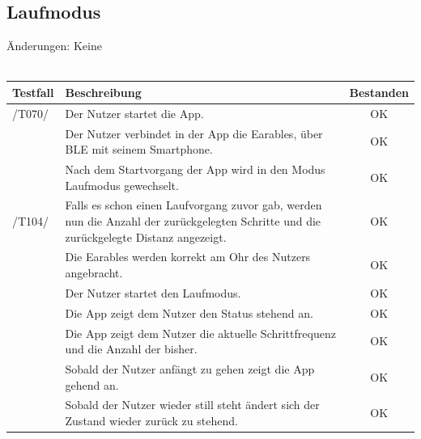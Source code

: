 \documentclass[a4paper,12pt]{article}
\newcommand{\testok}[0]{
	\cellcolor{green!25} OK
}
\begin{document}
\subsection{Laufmodus}
Änderungen: Keine
\\
\\
\begin{tabular}{ |p{1.5cm} | p{12cm} | c| }
	\hline
	\textbf{Testfall} & \textbf{Beschreibung} & \textbf{Bestanden}\\
	\hline
	/T070/ & Der Nutzer startet die App. & \testok \\
	\hline
	& Der Nutzer verbindet in der App die Earables, über BLE mit seinem Smartphone. & \testok \\
	\hline
	& Nach dem Startvorgang der App wird in den Modus \glqq Laufmodus\grqq{} gewechselt. & \testok \\
	\hline
	/T104/ & Falls es schon einen Laufvorgang zuvor gab, werden nun die Anzahl der zurückgelegten Schritte und die zurückgelegte Distanz angezeigt.& \testok \\
	\hline
	& Die Earables werden korrekt am Ohr des Nutzers angebracht. & \testok \\
	\hline
	& Der Nutzer startet den Laufmodus. & \testok \\
	\hline
	& Die App zeigt dem Nutzer den Status \glqq stehend\grqq{} an. & \testok \\
	\hline
	& Die App zeigt dem Nutzer die aktuelle Schrittfrequenz und die Anzahl der bisher. & \testok \\
	\hline
	& Sobald der Nutzer anfängt zu gehen zeigt die App \glqq gehend\grqq{} an. & \testok \\
	\hline
	& Sobald der Nutzer wieder still steht ändert sich der Zustand wieder zurück zu \glqq stehend\grqq. & \testok \\
	\hline	
\end{tabular}
\end{document}
